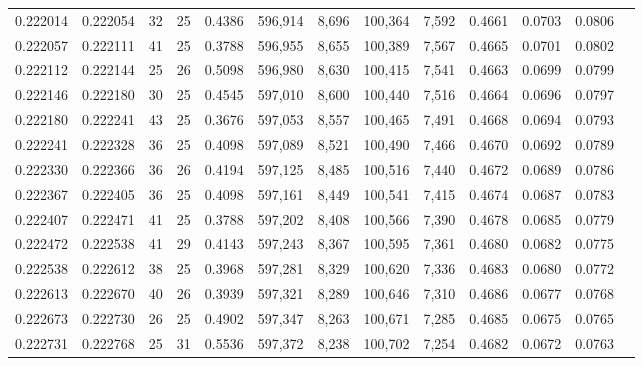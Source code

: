 \begin{tabular}{rrrrrrrrrrrrr}
0.222014 & 0.222054 &  32 &  25 &                                     0.4386 & 596,914 &   8,696 & 100,364 &   7,592 & 0.4661 & 0.0703 & 0.0806 \\
0.222057 & 0.222111 &  41 &  25 &                                     0.3788 & 596,955 &   8,655 & 100,389 &   7,567 & 0.4665 & 0.0701 & 0.0802 \\
0.222112 & 0.222144 &  25 &  26 &                                     0.5098 & 596,980 &   8,630 & 100,415 &   7,541 & 0.4663 & 0.0699 & 0.0799 \\
0.222146 & 0.222180 &  30 &  25 &                                     0.4545 & 597,010 &   8,600 & 100,440 &   7,516 & 0.4664 & 0.0696 & 0.0797 \\
0.222180 & 0.222241 &  43 &  25 &                                     0.3676 & 597,053 &   8,557 & 100,465 &   7,491 & 0.4668 & 0.0694 & 0.0793 \\
0.222241 & 0.222328 &  36 &  25 &                                     0.4098 & 597,089 &   8,521 & 100,490 &   7,466 & 0.4670 & 0.0692 & 0.0789 \\
0.222330 & 0.222366 &  36 &  26 &                                     0.4194 & 597,125 &   8,485 & 100,516 &   7,440 & 0.4672 & 0.0689 & 0.0786 \\
0.222367 & 0.222405 &  36 &  25 &                                     0.4098 & 597,161 &   8,449 & 100,541 &   7,415 & 0.4674 & 0.0687 & 0.0783 \\
0.222407 & 0.222471 &  41 &  25 &                                     0.3788 & 597,202 &   8,408 & 100,566 &   7,390 & 0.4678 & 0.0685 & 0.0779 \\
0.222472 & 0.222538 &  41 &  29 &                                     0.4143 & 597,243 &   8,367 & 100,595 &   7,361 & 0.4680 & 0.0682 & 0.0775 \\
0.222538 & 0.222612 &  38 &  25 &                                     0.3968 & 597,281 &   8,329 & 100,620 &   7,336 & 0.4683 & 0.0680 & 0.0772 \\
0.222613 & 0.222670 &  40 &  26 &                                     0.3939 & 597,321 &   8,289 & 100,646 &   7,310 & 0.4686 & 0.0677 & 0.0768 \\
0.222673 & 0.222730 &  26 &  25 &                                     0.4902 & 597,347 &   8,263 & 100,671 &   7,285 & 0.4685 & 0.0675 & 0.0765 \\
0.222731 & 0.222768 &  25 &  31 &                                     0.5536 & 597,372 &   8,238 & 100,702 &   7,254 & 0.4682 & 0.0672 & 0.0763 \\

\end{tabular}
